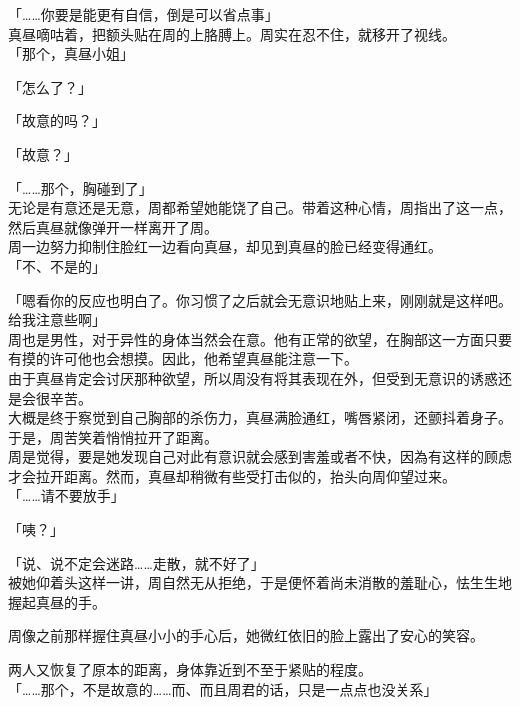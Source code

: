 「……你要是能更有自信，倒是可以省点事」\\

真昼嘀咕着，把额头贴在周的上胳膊上。周实在忍不住，就移开了视线。\\

「那个，真昼小姐」

「怎么了？」

「故意的吗？」

「故意？」

「……那个，胸碰到了」\\

无论是有意还是无意，周都希望她能饶了自己。带着这种心情，周指出了这一点，然后真昼就像弹开一样离开了周。\\

周一边努力抑制住脸红一边看向真昼，却见到真昼的脸已经变得通红。\\

「不、不是的」

「嗯看你的反应也明白了。你习惯了之后就会无意识地贴上来，刚刚就是这样吧。给我注意些啊」\\%

周也是男性，对于异性的身体当然会在意。他有正常的欲望，在胸部这一方面只要有摸的许可他也会想摸。因此，他希望真昼能注意一下。\\

由于真昼肯定会讨厌那种欲望，所以周没有将其表现在外，但受到无意识的诱惑还是会很辛苦。\\

大概是终于察觉到自己胸部的杀伤力，真昼满脸通红，嘴唇紧闭，还颤抖着身子。于是，周苦笑着悄悄拉开了距离。\\

周是觉得，要是她发现自己对此有意识就会感到害羞或者不快，因為有这样的顾虑才会拉开距离。然而，真昼却稍微有些受打击似的，抬头向周仰望过来。\\

「……请不要放手」

「咦？」

「说、说不定会迷路……走散，就不好了」\\

被她仰着头这样一讲，周自然无从拒绝，于是便怀着尚未消散的羞耻心，怯生生地握起真昼的手。

周像之前那样握住真昼小小的手心后，她微红依旧的脸上露出了安心的笑容。

两人又恢复了原本的距离，身体靠近到不至于紧贴的程度。\\

「……那个，不是故意的……而、而且周君的话，只是一点点也没关系」


